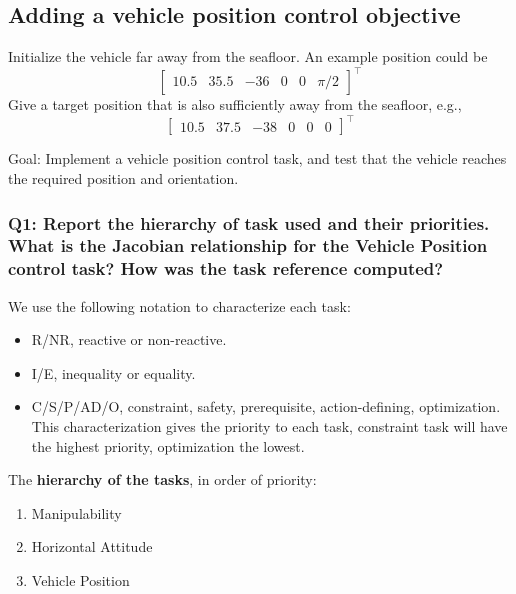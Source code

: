 \documentclass{article}
\begin{document}
\subsection{Adding a vehicle position control objective}
Initialize the vehicle far away from the seafloor. An example position could be
\begin{displaymath}
\begin{bmatrix} 10.5 & 35.5 & -36 & 0 & 0 & \pi/2\end{bmatrix}^\top
\end{displaymath} 
Give a target position that is also sufficiently away from the seafloor, e.g.,
\begin{displaymath}
\begin{bmatrix} 10.5 & 37.5 & -38 & 0 & 0 & 0 \end{bmatrix}^\top
\end{displaymath}

Goal: Implement a vehicle position control task, and test that the vehicle reaches the required position and orientation.



\subsubsection{Q1: Report the hierarchy of task used and their priorities. What is the Jacobian relationship for the Vehicle Position control task? How was the task reference computed?}

We use the following notation to characterize each task:
\begin{itemize}
    \item R/NR, reactive or non-reactive.
    \item I/E, inequality or equality.
    \item C/S/P/AD/O, constraint, safety, prerequisite, action-defining, optimization. This characterization gives the priority to each task, constraint task will have the highest priority, optimization the lowest.
\end{itemize}

\noindent
\vspace{5px}
The \textbf{hierarchy of the tasks}, in order of priority:
\begin{enumerate}
    \item Manipulability 
    \item Horizontal Attitude
    \item Vehicle Position
\end{enumerate}
\end{document}
